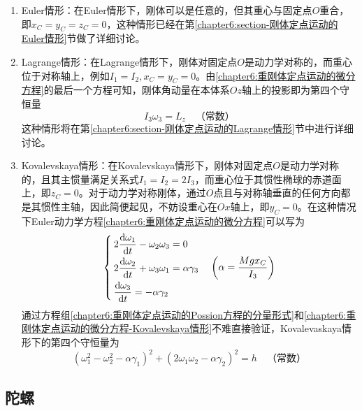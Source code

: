 \begin{enumerate}
\item Euler情形：在Euler情形下，刚体可以是任意的，但其重心与固定点$O$重合，即$x_C=y_C=z_C=0$，这种情形已经在第\ref{chapter6:section-刚体定点运动的Euler情形}节做了详细讨论。

\item Lagrange情形：在Lagrange情形下，刚体对固定点$O$是动力学对称的，而重心位于对称轴上，例如$I_1=I_2, x_C=y_C=0$。由\eqref{chapter6:重刚体定点运动的微分方程}的最后一个方程可知，刚体角动量在本体系$Oz$轴上的投影即为第四个守恒量
\begin{equation}
	I_3\omega_3=L_z\quad \text{（常数）}
\end{equation}
这种情形将在第\ref{chapter6:section-刚体定点运动的Lagrange情形}节中进行详细讨论。

\item Kovalevskaya情形：在Kovalevskaya情形下，刚体对固定点$O$是动力学对称的，且其主惯量满足关系式$I_1=I_2=2I_3$，而重心位于其惯性椭球的赤道面上，即$z_C=0$。对于动力学对称刚体，通过$O$点且与对称轴垂直的任何方向都是其惯性主轴，因此简便起见，不妨设重心在$Ox$轴上，即$y_C=0$。在这种情况下Euler动力学方程\eqref{chapter6:重刚体定点运动的微分方程}可以写为
\begin{equation}
\begin{cases}
	2\dfrac{\mathrm{d} \omega_1}{\mathrm{d} t} - \omega_2 \omega_3 = 0 \\[1.5ex]
	2\dfrac{\mathrm{d} \omega_2}{\mathrm{d} t} + \omega_3 \omega_1 = \alpha\gamma_3 \\[1.5ex]
	\dfrac{\mathrm{d} \omega_3}{\mathrm{d} t} = -\alpha\gamma_2
\end{cases}\left(\alpha=\frac{Mgx_C}{I_3}\right)
\label{chapter6:重刚体定点运动的微分方程-Kovalevskaya情形}
\end{equation}
通过方程组\eqref{chapter6:重刚体定点运动的Possion方程的分量形式}和\eqref{chapter6:重刚体定点运动的微分方程-Kovalevskaya情形}不难直接验证，Kovalevaskaya情形下的第四个守恒量为
\begin{equation}
	(\omega_1^2-\omega_2^2-\alpha\gamma_1)^2+(2\omega_1\omega_2-\alpha\gamma_2)^2=h\quad \text{（常数）}
	\label{chapter6:Kovalevskaya情形的第四个守恒量}
\end{equation}
\end{enumerate}

\subsection{陀螺}\label{chapter6:subsection-陀螺}

